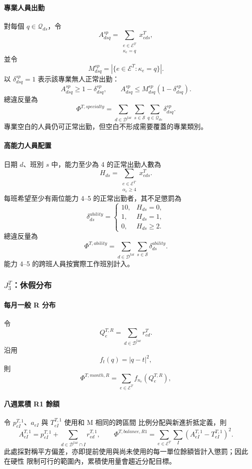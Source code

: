 \documentclass[a4paper,12pt]{article}
\begin{document}
\paragraph{專業人員出勤}
對每個 \(q\in\mathcal{Q}_{ds}\)，令
\[
  A^{sp}_{dsq}
  =
  \sum_{\substack{e\in\mathcal{E}^{T}\\\kappa_e=q}}x^{T}_{eds},
\]
並令
\[
  M^{sp}_{dsq}
  =
  \left|\{e\in\mathcal{E}^{T}:\kappa_e=q\}\right|.
\]
以 \(\delta^{sp}_{dsq}=1\) 表示該專業無人正常出勤：
\[
  A^{sp}_{dsq}\geq1-\delta^{sp}_{dsq},
  \qquad
  A^{sp}_{dsq}\leq M^{sp}_{dsq}(1-\delta^{sp}_{dsq}).
\]
總違反量為
\[
  \Phi^{T,specialty}
  =
  \sum_{d\in\mathcal{D}^{\mathrm{tar}}}
  \sum_{s\in\mathcal{S}}
  \sum_{q\in\mathcal{Q}_{ds}}\delta^{sp}_{dsq}.
\]
專業空白的人員仍可正常出勤，但空白不形成需要覆蓋的專業類別。

\paragraph{高能力人員配置}
日期 \(d\)、班別 \(s\) 中，能力至少為 4 的正常出勤人數為
\[
  H_{ds}
  =
  \sum_{\substack{e\in\mathcal{E}^{T}\\\alpha_e\geq4}}x^{T}_{eds}.
\]
每班希望至少有兩位能力 4--5 的正常出勤者，其不足懲罰為
\[
  \delta^{ability}_{ds}
  =
  \begin{cases}
    10, & H_{ds}=0,\\
    1, & H_{ds}=1,\\
    0, & H_{ds}\geq2.
  \end{cases}
\]
總違反量為
\[
  \Phi^{T,ability}
  =
  \sum_{d\in\mathcal{D}^{\mathrm{tar}}}
  \sum_{s\in\mathcal{S}}\delta^{ability}_{ds}.
\]
能力 4--5 的跨班人員按實際工作班別計入。

\subsubsection{\texorpdfstring{$J^T_3$}{J3}：休假分布}

\paragraph{每月一般 R 分布}
令
\[
  Q^{T,R}_e=\sum_{d\in\mathcal{D}^{\mathrm{tar}}}r^{T}_{ed}.
\]
沿用
\[
  f_t(q)=|q-t|^2,
\]
則
\[
  \Phi^{T,month,R}
  =
  \sum_{e\in\mathcal{E}^{T}}f_{n_e}\!\left(Q^{T,R}_e\right),
\]

\paragraph{八週累積 R1 餘額}
令 \(p^{T,1}_{eI}\)、\(a_{eI}\) 與 \(T^{T,1}_{eI}\) 使用和 M 相同的跨區間
比例分配與新進折抵定義，則
\[
  A^{T,1}_{eI}=p^{T,1}_{eI}
  +\sum_{d\in\mathcal D^{\mathrm{tar}}\cap I}r^{T,1}_{ed},
  \qquad
  \Phi^{T,balance,R1}=\sum_{e\in\mathcal E^T}\sum_I
  \left(A^{T,1}_{eI}-T^{T,1}_{eI}\right)^2.
\]
此處採對稱平方偏差，亦即提前使用與尚未使用的每一單位餘額皆計入懲罰；因此在硬性
限制可行的範圍內，累積使用量會趨近分配目標。
\end{document}
